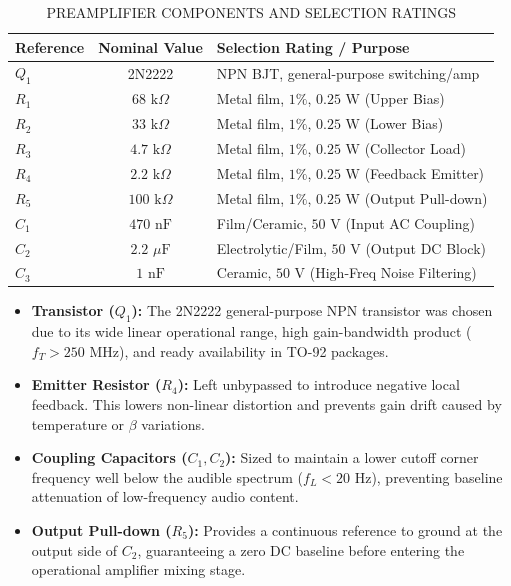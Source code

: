\documentclass[conference,letterpaper]{IEEEtran}
\begin{document}
\begin{table}[htbp]
\caption{PREAMPLIFIER COMPONENTS AND SELECTION RATINGS}
\label{tab:preamp_components}
\centering
\begin{tabular}{l|c|l}
\hline
\textbf{Reference} & \textbf{Nominal Value} & \textbf{Selection Rating / Purpose} \\
\hline
$Q_1$ & 2N2222 & NPN BJT, general-purpose switching/amp \\
$R_1$ & $68\text{~k}\Omega$ & Metal film, $1\%$, $0.25\text{~W}$ (Upper Bias) \\
$R_2$ & $33\text{~k}\Omega$ & Metal film, $1\%$, $0.25\text{~W}$ (Lower Bias) \\
$R_3$ & $4.7\text{~k}\Omega$ & Metal film, $1\%$, $0.25\text{~W}$ (Collector Load) \\
$R_4$ & $2.2\text{~k}\Omega$ & Metal film, $1\%$, $0.25\text{~W}$ (Feedback Emitter) \\
$R_5$ & $100\text{~k}\Omega$ & Metal film, $1\%$, $0.25\text{~W}$ (Output Pull-down) \\
$C_1$ & $470\text{~nF}$ & Film/Ceramic, $50\text{~V}$ (Input AC Coupling) \\
$C_2$ & $2.2\text{~}\mu\text{F}$ & Electrolytic/Film, $50\text{~V}$ (Output DC Block) \\
$C_3$ & $1\text{~nF}$ & Ceramic, $50\text{~V}$ (High-Freq Noise Filtering) \\
\hline
\end{tabular}
\end{table}

\begin{itemize}
    \item \textbf{Transistor ($Q_1$):} The 2N2222 general-purpose NPN transistor was chosen due to its wide linear operational range, high gain-bandwidth product ($f_T > 250\text{~MHz}$), and ready availability in TO-92 packages.
    \item \textbf{Emitter Resistor ($R_4$):} Left unbypassed to introduce negative local feedback. This lowers non-linear distortion and prevents gain drift caused by temperature or $\beta$ variations.
    \item \textbf{Coupling Capacitors ($C_1, C_2$):} Sized to maintain a lower cutoff corner frequency well below the audible spectrum ($f_L < 20\text{~Hz}$), preventing baseline attenuation of low-frequency audio content.
    \item \textbf{Output Pull-down ($R_5$):} Provides a continuous reference to ground at the output side of $C_2$, guaranteeing a zero DC baseline before entering the operational amplifier mixing stage.
\end{itemize}
\end{document}
